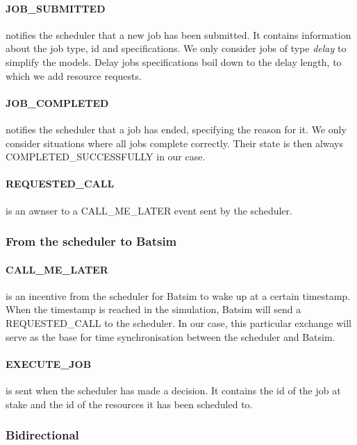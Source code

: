 \paragraph{JOB\_SUBMITTED}
notifies the scheduler that a new job has been submitted. It contains
information about the job type, id and specifications. We only consider jobs of
type \textit{delay} to simplify the models. Delay jobs specifications boil down
to the delay length, to which we add resource requests.

\paragraph{JOB\_COMPLETED}
notifies the scheduler that a job has ended, specifying the reason for it. We
only consider situations where all jobs complete correctly. Their state is then
always COMPLETED\_SUCCESSFULLY in our case.

\paragraph{REQUESTED\_CALL}
is an awnser to a CALL\_ME\_LATER event sent by the scheduler.

\subsubsection{From the scheduler to Batsim}

\paragraph{CALL\_ME\_LATER}
is an incentive from the scheduler for Batsim to wake up at a certain
timestamp. When the timestamp is reached in the simulation, Batsim will send a
REQUESTED\_CALL to the scheduler. In our case, this particular exchange will
serve as the base for time synchronisation between the scheduler and Batsim.

\paragraph{EXECUTE\_JOB}
is sent when the scheduler has made a decision. It contains the id of the job
at stake and the id of the resources it has been scheduled to.

\subsubsection{Bidirectional}

